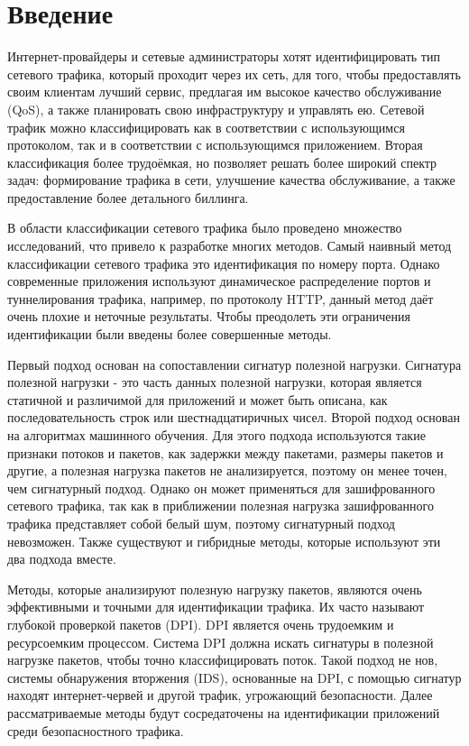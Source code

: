 \section{Введение}
\label{sec:Chapter0} 

Интернет-провайдеры и сетевые администраторы хотят идентифицировать тип сетевого трафика, который проходит через их сеть, для того,
чтобы предоставлять своим клиентам лучший сервис, предлагая им высокое качество обслуживание (QoS),
а также планировать свою инфраструктуру и управлять ею. Сетевой трафик можно классифицировать как в соответствии с использующимся протоколом,
так и в соответствии с использующимся приложением. Вторая классификация более трудоёмкая, но позволяет решать более широкий спектр задач:
формирование трафика в сети, улучшение качества обслуживание, а также предоставление более детального биллинга.

В области классификации сетевого трафика было проведено множество исследований, что привело к разработке многих методов.
Самый наивный метод классификации сетевого трафика это идентификация по номеру порта.
Однако современные приложения используют динамическое распределение портов и туннелирования трафика, например, по протоколу HTTP,
данный метод даёт очень плохие и неточные результаты. Чтобы преодолеть эти ограничения идентификации были введены более совершенные методы.

Первый подход основан на сопоставлении сигнатур полезной нагрузки. Сигнатура полезной нагрузки - это часть данных полезной нагрузки,
которая является статичной и различимой для приложений и может быть описана, как последовательность строк или шестнадцатиричных чисел.
Второй подход основан на алгоритмах машинного обучения. Для этого подхода используются такие признаки потоков и пакетов,
как задержки между пакетами, размеры пакетов и другие, а полезная нагрузка пакетов не анализируется, поэтому он менее точен, чем сигнатурный подход.
Однако он может применяться для зашифрованного сетевого трафика, так как в приближении полезная нагрузка зашифрованного трафика представляет собой белый шум,
поэтому сигнатурный подход невозможен. Также существуют и гибридные методы, которые используют эти два подхода вместе.

Методы, которые анализируют полезную нагрузку пакетов, являются очень эффективными и точными для идентификации трафика.
Их часто называют глубокой проверкой пакетов (DPI). DPI является очень трудоемким и ресурсоемким процессом.
Система DPI должна искать сигнатуры в полезной нагрузке пакетов, чтобы точно классифицировать поток. Такой подход не нов, системы обнаружения вторжения (IDS),
основанные на DPI, с помощью сигнатур находят интернет-червей и другой трафик, угрожающий безопасности.
Далее рассматриваемые методы будут сосредаточены на идентификации приложений среди безопасностного трафика.

